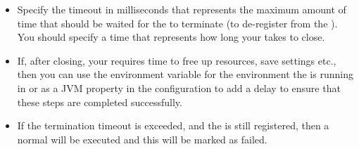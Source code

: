 \begin{itemize}
\item Specify the timeout in milliseconds that represents the maximum amount of time that should be waited for the \gdaut{} to terminate (to de-register from the \gdagent{}). You should specify a time that represents how long your \gdaut{} takes to close.
\item If, after closing, your \gdaut{} requires time to free up resources, save settings etc., then you can use the environment variable   for the environment the \gdagent{} is running in  or as a JVM property in the \gdaut{} configuration  to add a delay to ensure that these steps are completed successfully. 
\item If the termination timeout is exceeded, and the \gdaut{} is still registered, then a normal  \gdaut{} will be executed and this \gdstep{} will be marked as failed.  
\end{itemize}


